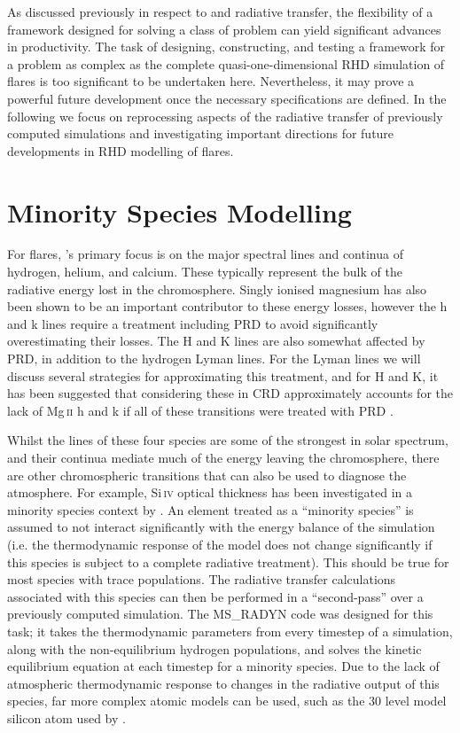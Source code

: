 As discussed previously in respect to \Lw{} and radiative transfer, the flexibility of a framework designed for solving a class of problem can yield significant advances in productivity.
The task of designing, constructing, and testing a framework for a problem as complex as the complete quasi-one-dimensional RHD simulation of flares is too significant to be undertaken here.
Nevertheless, it may prove a powerful future development once the necessary specifications are defined.
In the following we focus on reprocessing aspects of the radiative transfer of previously computed \Radyn{} simulations and investigating important directions for future developments in RHD modelling of flares.

\section{Minority Species Modelling}

For flares, \Radyn{}'s primary focus is on the major spectral lines and continua of hydrogen, helium, and calcium.
These typically represent the bulk of the radiative energy lost in the chromosphere.
Singly ionised magnesium has also been shown to be an important contributor to these energy losses, however the h and k lines require a treatment including PRD to avoid significantly overestimating their losses.
The \Caii{} H and K lines are also somewhat affected by PRD, in addition to the hydrogen Lyman lines.
For the Lyman lines we will discuss several strategies for approximating this treatment, and for \Caii{} H and K, it has been suggested that considering these in CRD approximately accounts for the lack of Mg\,\textsc{ii} h and k if all of these transitions were treated with PRD \citep{Kerr2019a}.

Whilst the lines of these four species are some of the strongest in solar spectrum, and their continua mediate much of the energy leaving the chromosphere, there are other chromospheric transitions that can also be used to diagnose the atmosphere.
For example, Si\,\textsc{iv} optical thickness has been investigated in a minority species context by \citet{Kerr2019c}.
An element treated as a ``minority species'' is assumed to not interact significantly with the energy balance of the simulation (i.e. the thermodynamic response of the model does not change significantly if this species is subject to a complete radiative treatment).
This should be true for most species with trace populations.
The radiative transfer calculations associated with this species can then be performed in a ``second-pass'' over a previously computed \Radyn{} simulation.
The MS\_RADYN code was designed for this task; it takes the thermodynamic parameters from every timestep of a \Radyn{} simulation, along with the non-equilibrium hydrogen populations, and solves the kinetic equilibrium equation at each timestep for a minority species.
Due to the lack of atmospheric thermodynamic response to changes in the radiative output of this species, far more complex atomic models can be used, such as the 30 level model silicon atom used by \citet{Kerr2019c}.

